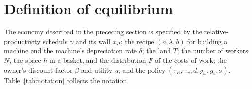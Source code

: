 \documentclass[12pt]{article}
\theoremstyle{plain}
\theoremstyle{definition}
\theoremstyle{remark}
\begin{document}
\section{Definition of equilibrium}\label{sec:economy}

The economy described in the preceding section is specified by the relative-productivity schedule
$\gamma$ and its wall $x_H$; the recipe $(a,\lambda,b)$ for building a machine and the machine's
depreciation rate $\delta$; the land $T$; the number of workers $N$, the space $h$ in a basket, and
the distribution $F$ of the costs of work; the owner's discount factor $\beta$ and utility $u$; and
the policy $(\tau_R,\tau_w,d,g_w,g_e,\sigma)$.
Table~\ref{tab:notation} collects the notation.
\end{document}
